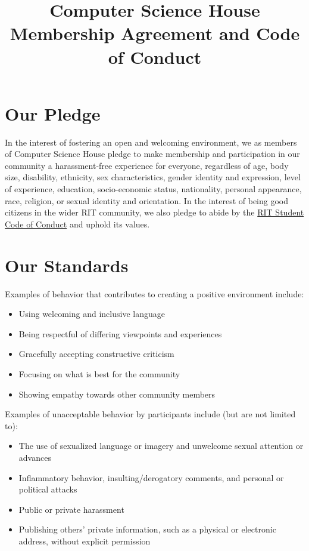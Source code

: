 \documentclass{article}
\title{
\textbf{Computer Science House}\\
Membership Agreement and Code of Conduct}
\author{}
\date{\datechanged}
\begin{document}
\maketitle

\section*{Our Pledge}

In the interest of fostering an open and welcoming environment, we as
members of Computer Science House pledge to make membership and
participation in our community a harassment-free experience for everyone,
regardless of age, body size, disability, ethnicity, sex characteristics,
gender identity and expression, level of experience, education,
socio-economic status, nationality, personal appearance, race, religion,
or sexual identity and orientation. In the interest of being good
citizens in the wider RIT community, we also pledge to abide by the
\href{https://www.rit.edu/studentaffairs/studentconduct/code-conduct}
{RIT Student Code of Conduct} and uphold its values.

\section*{Our Standards}

Examples of behavior that contributes to creating a positive environment
include:

\begin{itemize}
    \item Using welcoming and inclusive language
    \item Being respectful of differing viewpoints and experiences
    \item Gracefully accepting constructive criticism
    \item Focusing on what is best for the community
    \item Showing empathy towards other community members
\end{itemize}

\begin{flushleft}
Examples of unacceptable behavior by participants include (but are not
limited to):
\end{flushleft}

\begin{itemize}
    \item The use of sexualized language or imagery and unwelcome sexual
          attention or advances
    \item Inflammatory behavior, insulting/derogatory comments, and personal
          or political attacks
    \item Public or private harassment
    \item Publishing others’ private information, such as a physical or
          electronic address, without explicit permission
\end{itemize}
\end{document}
